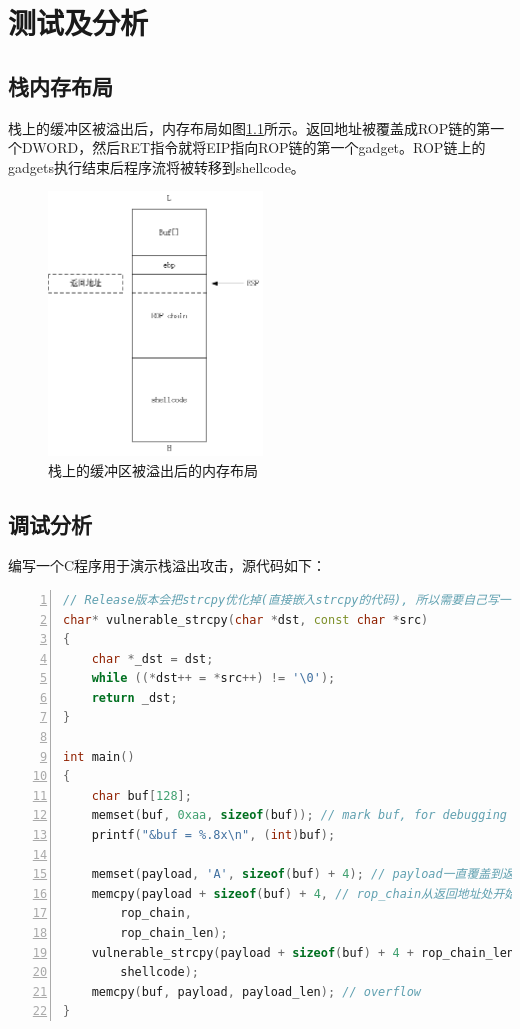 \documentclass[bachelor]{thesis-uestc}
\begin{document}
\chapter{测试及分析}
\section{栈内存布局}
栈上的缓冲区被溢出后，内存布局如图\ref{fig:stack2}所示。返回地址被覆盖成ROP链的第一个DWORD，然后RET指令就将EIP指向ROP链的第一个gadget。ROP链上的gadgets执行结束后程序流将被转移到shellcode。

\begin{figure}[htbp]
	\centering\includegraphics[height=7cm]{images/stack2.png}
	\caption{栈上的缓冲区被溢出后的内存布局}
	\label{fig:stack2}
\end{figure}

\section{调试分析}
编写一个C程序用于演示栈溢出攻击，源代码如下：

\begin{lstlisting}[language=C++, basicstyle=\ttfamily\tiny, numbers=left, numberstyle=\tiny, keywordstyle=\color{blue!70}, commentstyle=\color{red!50!green!50!blue!50}, frame=shadowbox, rulesepcolor=\color{red!20!green!20!blue!20}]
// Release版本会把strcpy优化掉(直接嵌入strcpy的代码), 所以需要自己写一个
char* vulnerable_strcpy(char *dst, const char *src)
{
	char *_dst = dst;
	while ((*dst++ = *src++) != '\0');
	return _dst;
}

int main()
{
	char buf[128];
	memset(buf, 0xaa, sizeof(buf)); // mark buf, for debugging
	printf("&buf = %.8x\n", (int)buf);

	memset(payload, 'A', sizeof(buf) + 4); // payload一直覆盖到返回地址前
	memcpy(payload + sizeof(buf) + 4, // rop_chain从返回地址处开始
		rop_chain,
		rop_chain_len);
	vulnerable_strcpy(payload + sizeof(buf) + 4 + rop_chain_len, // rop_chain后跟shellcode
		shellcode);
	memcpy(buf, payload, payload_len); // overflow
}
\end{lstlisting}
\end{document}
